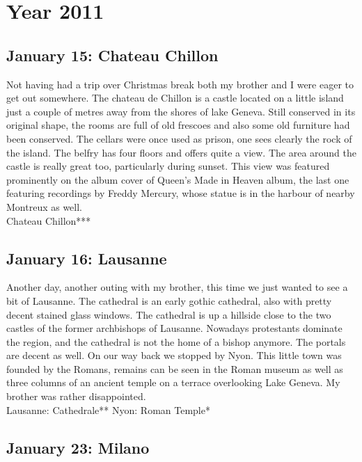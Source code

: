\chapter{Year 2011}
\label{2011}

\section{January 15: Chateau Chillon}
\label{2011:Chillon}

Not having had a trip over Christmas break both my brother and I were eager to get out somewhere. The chateau de Chillon is a castle located on a little island just a couple of metres away from the shores of lake Geneva. Still conserved in its original shape, the rooms are full of old frescoes and also some old furniture had been conserved. The cellars were once used as prison, one sees clearly the rock of the island. The belfry has four floors and offers quite a view. The area around the castle is really great too, particularly during sunset. This view was featured prominently on the album cover of Queen's Made in Heaven album, the last one featuring recordings by Freddy Mercury, whose statue is in the harbour of nearby Montreux as well.\\

Chateau Chillon***

\section{January 16: Lausanne}
\label{Lausanne2011}

Another day, another outing with my brother, this time we just wanted to see a bit of Lausanne. The cathedral is an early gothic cathedral, also with pretty decent stained glass windows. The cathedral is up a hillside close to the two castles of the former archbishops of Lausanne. Nowadays protestants dominate the region, and the cathedral is not the home of a bishop anymore. The portals are decent as well. On our way back we stopped by Nyon. This little town was founded by the Romans, remains can be seen in the Roman museum as well as three columns of an ancient temple on a terrace overlooking Lake Geneva. My brother was rather disappointed.\\

Lausanne: Cathedrale**
Nyon: Roman Temple*

\section{January 23: Milano}
\label{Milano2011}

